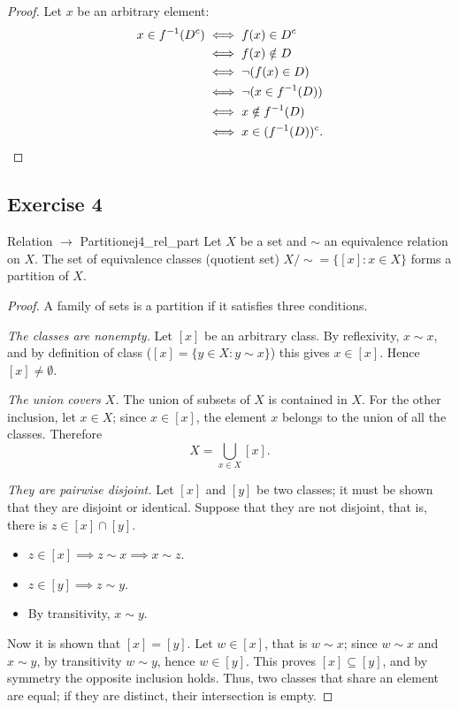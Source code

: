 \documentclass[11pt, a4paper]{article}
\begin{document}
\begin{proof}
Let $x$ be an arbitrary element:
\begin{align*}
x \in f^{-1}(D^c) &\iff f(x) \in D^c \\
&\iff f(x) \notin D \\
&\iff \neg (f(x) \in D) \\
&\iff \neg (x \in f^{-1}(D)) \\
&\iff x \notin f^{-1}(D) \\
&\iff x \in (f^{-1}(D))^c. \qedhere
\end{align*}
\end{proof}

\subsection*{Exercise 4}

\begin{proposicion}{Relation $\to$ Partition}{ej4_rel_part}
Let $X$ be a set and $\sim$ an equivalence relation on $X$.
The set of equivalence classes (quotient set) $X/\sim = \{ [x] : x \in X \}$ forms a
partition of $X$.
\end{proposicion}

\begin{proof}
A family of sets is a partition if it satisfies three conditions.

\textit{The classes are nonempty.} Let $[x]$ be an arbitrary class. By reflexivity, $x \sim x$, and
by definition of class ($[x] = \{y \in X : y \sim x\}$) this gives $x \in [x]$. Hence
$[x] \neq \emptyset$.

\textit{The union covers $X$.} The union of subsets of $X$ is contained in $X$. For the other
inclusion, let $x \in X$; since $x \in [x]$, the element $x$ belongs to the union of all the classes.
Therefore
$$ X = \bigcup_{x \in X} [x]. $$

\textit{They are pairwise disjoint.} Let $[x]$ and $[y]$ be two classes; it must be shown that they are disjoint or
identical. Suppose that they are not disjoint, that is, there is $z \in [x] \cap [y]$.
\begin{itemize}
    \item $z \in [x] \implies z \sim x \implies x \sim z$.
    \item $z \in [y] \implies z \sim y$.
    \item By transitivity, $x \sim y$.
\end{itemize}
Now it is shown that $[x] = [y]$. Let $w \in [x]$, that is $w \sim x$; since $w \sim x$ and $x \sim y$, by
transitivity $w \sim y$, hence $w \in [y]$. This proves $[x] \subseteq [y]$, and by symmetry the
opposite inclusion holds. Thus, two classes that share an element are equal; if they are distinct, their
intersection is empty.
\end{proof}
\end{document}
